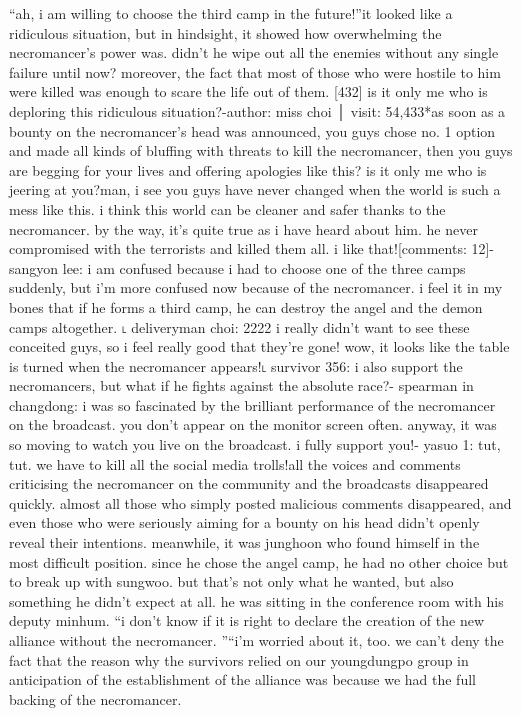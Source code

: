 “ah, i am willing to choose the third camp in the future!”it looked like a ridiculous situation, but in hindsight, it showed how overwhelming the necromancer’s power was.
didn’t he wipe out all the enemies without any single failure until now? moreover, the fact that most of those who were hostile to him were killed was enough to scare the life out of them.
[432] is it only me who is deploring this ridiculous situation?-author: miss choi │ visit: 54,433*as soon as a bounty on the necromancer’s head was announced, you guys chose no.
 1 option and made all kinds of bluffing with threats to kill the necromancer, then you guys are begging for your lives and offering apologies like this? is it only me who is jeering at you?man, i see you guys have never changed when the world is such a mess like this.
 i think this world can be cleaner and safer thanks to the necromancer.
 by the way, it’s quite true as i have heard about him.
 he never compromised with the terrorists and killed them all.
 i like that![comments: 12]- sangyon lee: i am confused because i had to choose one of the three camps suddenly, but i’m more confused now because of the necromancer.
 i feel it in my bones that if he forms a third camp, he can destroy the angel and the demon camps altogether.
˪ deliveryman choi: 2222 i really didn’t want to see these conceited guys, so i feel really good that they’re gone! wow, it looks like the table is turned when the necromancer appears!˪ survivor 356: i also support the necromancers, but what if he fights against the absolute race?- spearman in changdong: i was so fascinated by the brilliant performance of the necromancer on the broadcast.
 you don’t appear on the monitor screen often.
 anyway, it was so moving to watch you live on the broadcast.
 i fully support you!- yasuo 1: tut, tut.
 we have to kill all the social media trolls!all the voices and comments criticising the necromancer on the community and the broadcasts disappeared quickly.
 almost all those who simply posted malicious comments disappeared, and even those who were seriously aiming for a bounty on his head didn’t openly reveal their intentions.
meanwhile, it was junghoon who found himself in the most difficult position.
 since he chose the angel camp, he had no other choice but to break up with sungwoo.
 but that’s not only what he wanted, but also something he didn’t expect at all.
he was sitting in the conference room with his deputy minhum.
“i don’t know if it is right to declare the creation of the new alliance without the necromancer.
”“i’m worried about it, too.
 we can’t deny the fact that the reason why the survivors relied on our youngdungpo group in anticipation of the establishment of the alliance was because we had the full backing of the necromancer.
